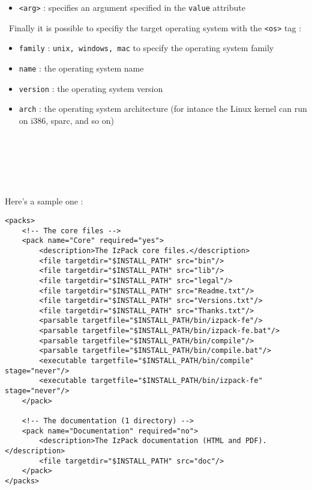 \begin{itemize}
\begin{itemize}
\begin{itemize}
      \item \texttt{<arg>} : specifies an argument specified in the
      \texttt{value} attribute
    
    \end{itemize}\
    Finally it is possible to specifiy the target operating system with the
    \texttt{<os>} tag :
    \begin{itemize}
    
      \item \texttt{family} : \texttt{unix, windows, mac} to specify the
      operating system family
      \item \texttt{name} : the operating system name
      \item \texttt{version} : the operating system version
      \item \texttt{arch} : the operating system architecture (for intance the
      Linux kernel can run on i386, sparc, and so on)
    
    \end{itemize}\
  
  \end{itemize}\

\end{itemize}\

Here's a sample one :
\footnotesize
\begin{verbatim}
<packs>
    <!-- The core files -->
    <pack name="Core" required="yes">
        <description>The IzPack core files.</description>
        <file targetdir="$INSTALL_PATH" src="bin"/>
        <file targetdir="$INSTALL_PATH" src="lib"/>
        <file targetdir="$INSTALL_PATH" src="legal"/>
        <file targetdir="$INSTALL_PATH" src="Readme.txt"/>
        <file targetdir="$INSTALL_PATH" src="Versions.txt"/>
        <file targetdir="$INSTALL_PATH" src="Thanks.txt"/>
        <parsable targetfile="$INSTALL_PATH/bin/izpack-fe"/>
        <parsable targetfile="$INSTALL_PATH/bin/izpack-fe.bat"/>
        <parsable targetfile="$INSTALL_PATH/bin/compile"/>
        <parsable targetfile="$INSTALL_PATH/bin/compile.bat"/>
        <executable targetfile="$INSTALL_PATH/bin/compile" stage="never"/>
        <executable targetfile="$INSTALL_PATH/bin/izpack-fe" stage="never"/>
    </pack>
    
    <!-- The documentation (1 directory) -->
    <pack name="Documentation" required="no">
        <description>The IzPack documentation (HTML and PDF).</description>
        <file targetdir="$INSTALL_PATH" src="doc"/>
    </pack>
</packs>
\end{verbatim}
\normalsize


